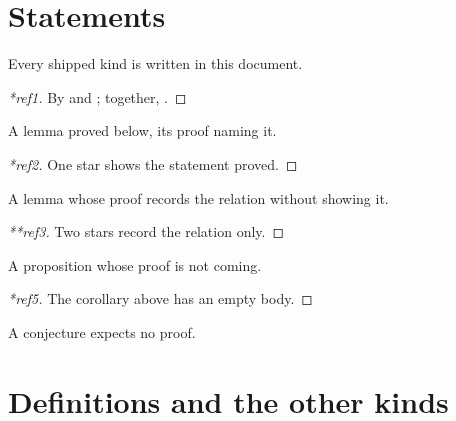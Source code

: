 \flmHeading[toc=true]
\section{Statements}{\flmLabels{}}

\begin{theorem}\flmLabels{\label{ref1}}
Every shipped kind is written in this document.
\end{theorem}

\begin{proof}[*ref1]
By  and ; together, .
\end{proof}

\begin{lemma}\flmLabels{\label{ref2}}
A lemma proved below, its proof naming it.
\end{lemma}

\begin{proof}[*ref2]
One star shows the statement proved.
\end{proof}

\begin{lemma}\flmLabels{\label{ref3}}
A lemma whose proof records the relation without showing it.
\end{lemma}

\begin{proof}[**ref3]
Two stars record the relation only.
\end{proof}

\begin{proposition}\flmLabels{\label{ref4}}\noproofref A proposition whose proof is not coming.
\end{proposition}

\begin{corollary}\flmLabels{\label{ref5}}
\end{corollary}

\begin{proof}[*ref5]
The corollary above has an empty body.
\end{proof}

\begin{conjecture}\flmLabels{\label{ref6}}
A conjecture expects no proof.
\end{conjecture}

\flmHeading[toc=true]
\section{Definitions and the other kinds}{\flmLabels{}}

